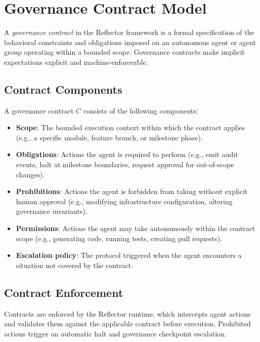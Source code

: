 \section{Governance Contract Model}
\label{sec:governance-model}

%

A \textit{governance contract} in the Reflector framework is a formal specification
of the behavioral constraints and obligations imposed on an autonomous agent or
agent group operating within a bounded scope. Governance contracts make implicit
expectations explicit and machine-enforceable.

\subsection{Contract Components}

A governance contract $C$ consists of the following components:

\begin{itemize}
  \item \textbf{Scope}: The bounded execution context within which the contract applies
    (e.g., a specific module, feature branch, or milestone phase).
  \item \textbf{Obligations}: Actions the agent is required to perform (e.g., emit
    audit events, halt at milestone boundaries, request approval for out-of-scope changes).
  \item \textbf{Prohibitions}: Actions the agent is forbidden from taking without explicit
    human approval (e.g., modifying infrastructure configuration, altering governance
    invariants).
  \item \textbf{Permissions}: Actions the agent may take autonomously within the contract
    scope (e.g., generating code, running tests, creating pull requests).
  \item \textbf{Escalation policy}: The protocol triggered when the agent encounters a
    situation not covered by the contract.
\end{itemize}

\subsection{Contract Enforcement}

Contracts are enforced by the Reflector runtime, which intercepts agent actions and
validates them against the applicable contract before execution. Prohibited actions
trigger an automatic halt and governance checkpoint escalation.
